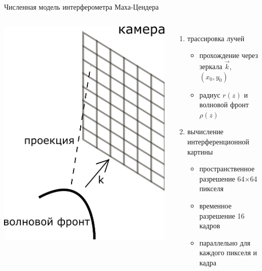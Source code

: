 \begin{frame}{Численная модель интерферометра Маха-Цендера}
\begin{columns}
\centering
\includegraphics[width=0.8\linewidth]{images/wave_front_projection.png}
\begin{enumerate}
    \item трассировка лучей 
    \begin{itemize}
        \item прохождение через зеркала $\vec{k}$, $(x_0, y_0)$
        \item радиус $r(z)$ и волновой фронт $\rho(z)$
    \end{itemize}
    \item вычисление интерференционной картины
    \begin{itemize}
        \item пространственное разрешение 64×64 пикселя
        \item временное разрешение 16 кадров
        \item параллельно для каждого пикселя и кадра
    \end{itemize}

    
\end{enumerate}

\end{columns}
\end{frame}



